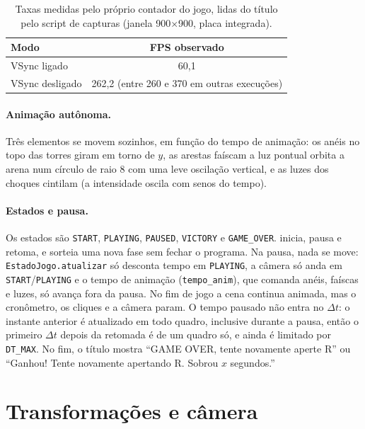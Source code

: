 \documentclass[a4paper,11pt]{article}
\newcommand{\tecla}[1]{\fbox{\footnotesize\ttfamily #1}}
\begin{document}
\begin{table}[H]
\centering\small
\begin{tabular}{@{}lc@{}}
\toprule
\textbf{Modo} & \textbf{FPS observado} \\
\midrule
VSync ligado & 60,1 \\
VSync desligado & 262,2 (entre 260 e 370 em outras execuções) \\
\bottomrule
\end{tabular}
\caption{Taxas medidas pelo próprio contador do jogo, lidas do título pelo
script de capturas (janela 900$\times$900, placa integrada).}
\end{table}

\paragraph{Animação autônoma.} Três elementos se movem sozinhos, em função do
tempo de animação: os anéis no topo das torres giram em torno de $y$, as arestas
faíscam a luz pontual orbita a arena num círculo de raio 8 com uma leve oscilação vertical, e as luzes dos choques cintilam (a intensidade oscila com senos do tempo).

\paragraph{Estados e pausa.} Os estados são \texttt{START}, \texttt{PLAYING},
\texttt{PAUSED}, \texttt{VICTORY} e \texttt{GAME\_OVER}. \tecla{Enter} inicia,
\tecla{P} pausa e retoma, e \tecla{R} sorteia uma nova fase sem fechar o
programa. Na pausa, nada se move: \texttt{EstadoJogo.atualizar} só desconta tempo
em \texttt{PLAYING}, a câmera só anda em \texttt{START}/\texttt{PLAYING} e o
tempo de animação (\texttt{tempo\_anim}), que comanda anéis, faíscas e luzes, só avança fora da pausa. No fim de jogo a cena continua animada, mas o cronômetro, os cliques e a câmera param. O tempo pausado não entra no $\Delta t$:
o instante anterior é atualizado em todo quadro, inclusive durante a pausa,
então o primeiro $\Delta t$ depois da retomada é de um quadro só, e ainda é
limitado por \texttt{DT\_MAX}. No fim, o título mostra
``GAME OVER, tente novamente aperte R'' ou
``Ganhou! Tente novamente apertando R. Sobrou $x$ segundos.''

\section{Transformações e câmera}
\end{document}

